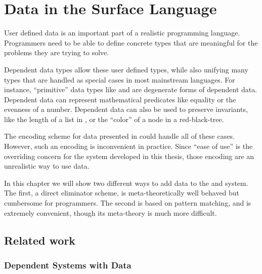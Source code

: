 \chapter{Data in the Surface Language}
\label{chapter:SurfaceData}
\thispagestyle{myheadings}


User defined data is an important part of a realistic programming language.
Programmers need to be able to define concrete types that are meaningful for the problems they are trying to solve.

Dependent data types allow these user defined types, while also unifying many types that are handled as special cases in most mainstream languages.
For instance, ``primitive'' data types like \Nat{} and \Bool{} are degenerate forms of dependent data.
Dependent data can represent mathematical predicates like equality or the evenness of a number.
Dependent data can also be used to preserve invariants, like the length of a list in \Vect{}, or the ``color'' of a node in a red-black-tree.

The encoding scheme for data presented in  could handle all of these cases.
However, such an encoding is inconvenient in practice.
Since ``ease of use'' is the overriding concern for the system developed in this thesis, those encoding are an unrealistic way to use data.

In this chapter we will show two different ways to add data to the \slang{} and \bidir{} system.
The first, a direct eliminator scheme, is meta-theoretically well behaved but cumbersome for programmers.
The second is based on pattern matching, and is extremely convenient, though its meta-theory is much more difficult.






\section{Related work}

\subsection{Dependent Systems with Data}

